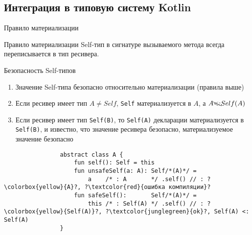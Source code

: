 \documentclass[handout,aspectratio=169,usenames,dvipsnames]{beamer}
\begin{document}
    \subsection{Интеграция в типовую систему Kotlin}

    \begin{frame}[fragile]{Правило материализации}
        \begin{block}{Правило материализации}
            Self-тип в сигнатуре вызываемого метода всегда переписывается в тип ресивера.
        \end{block}
        \begin{block}{Безопасность Self-типов}
            \begin{enumerate}
                \item Значение Self-типа безопасно относительно материализации (правила выше)
                \item Если ресивер имеет тип $A \neq Self$, \texttt{Self} материализуется в $A$, а $A \bcancel{<:} Self(A)$
                \item Если ресивер имеет тип \texttt{Self(B)}, то \texttt{Self(A)} декларации материализуется в \texttt{Self(B)}, и известно, что значение ресивера безопасно, материализуемое значение безопасно
            \end{enumerate}
            \begin{verbatim}
                abstract class A {
                    fun self(): Self = this
                    fun unsafeSelf(a: A): Self/*(A)*/ =
                        a    /* : A       */ .self() // : ?\colorbox{yellow}{A}?, ?\textcolor{red}{ошибка компиляции}?
                    fun safeSelf():       Self/*(A)*/ =
                        this /* : Self(A) */ .self() // : ?\colorbox{yellow}{Self(A)}?, ?\textcolor{junglegreen}{ok}?, Self(A) <: Self(A)
                }
            \end{verbatim}
        \end{block}
    \end{frame}
%
\end{document}
